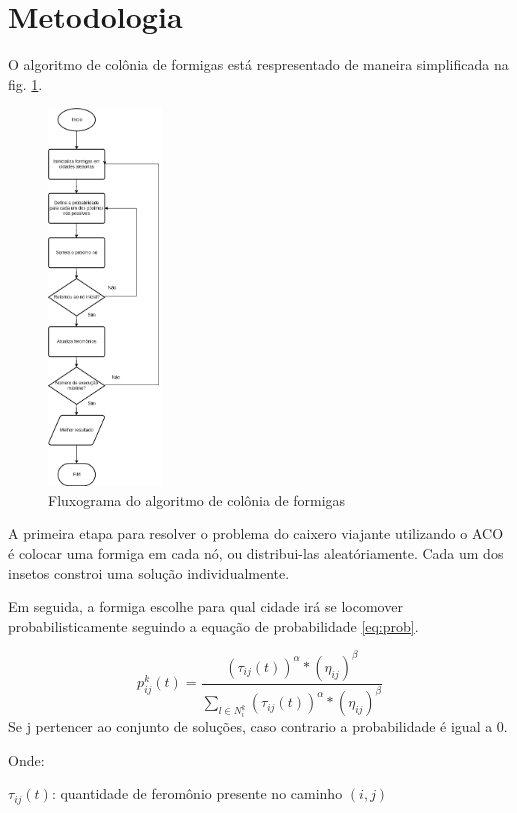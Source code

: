 \documentclass[11pt]{article}
\begin{document}
\section{Metodologia}
\label{sec:desen}

O algoritmo de colônia de formigas está respresentado de maneira simplificada na fig. \ref{fig:flux}.

\begin{figure}
  \centering
  \includegraphics[height=10cm]{formigas.png}
  \caption{Fluxograma do algoritmo de colônia de formigas}
  \label{fig:flux}
\end{figure}

A primeira etapa para resolver o problema do caixero viajante utilizando o ACO é
colocar uma formiga em cada nó, ou distribui-las aleatóriamente. Cada um dos insetos
constroi uma solução individualmente.

Em seguida, a formiga escolhe para qual cidade irá se locomover probabilisticamente
seguindo a equação de probabilidade \ref{eq:prob}.

\begin{equation}\label{eq:prob}
  p_{ij}^{k}(t)=
    \frac{(\tau_{ij}(t))^\alpha * (\eta_{ij})^\beta}{\sum_{l\in N_{i}^{k}}{(\tau_{ij}(t))^\alpha * (\eta_{ij})^\beta}}
\end{equation}
Se j pertencer ao conjunto de soluções, caso contrario a probabilidade é igual a 0.

Onde:

$\tau_{ij}(t)$: quantidade de feromônio presente no caminho $(i,j)$
\end{document}
